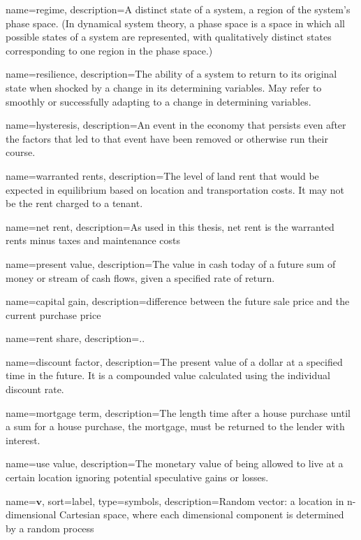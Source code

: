 {
name=regime,
description={A distinct state of a system, a region of the system's phase space. (In dynamical system theory, a phase space is a space in which all possible states of a system are represented, with qualitatively distinct  states corresponding to one region in the phase space.)}
}

{
name=resilience,
description={The ability of a system to return to its original state when shocked by a change in its determining variables. May refer to smoothly or successfully adapting to a change in  determining variables. }
}

{
name=hysteresis,
description={An event in the economy that persists even after the factors that led to that event have been removed or otherwise run their course.}
}

{
name=warranted rents,
description={The level of land rent that would be expected in equilibrium based on location and transportation costs. It may not be the rent charged to a tenant.}
}

{
name=net rent,
description={As used in this thesis, net rent is the warranted rents minus taxes and maintenance costs }
}

{
name=present value,
description={The value in cash today of a future sum of money or stream of cash flows, given a specified rate of return.}
}

{
name=capital gain,
description={difference between the future sale price and the current purchase price}
}

{
name=rent share,
description={..}
}

{
name=discount factor,
description={The present value of a dollar at a specified time in the future. It is a compounded value calculated using the individual discount rate.}
}

{
name=mortgage term,
description={The length time after a house purchase until a sum for a house purchase, the mortgage, must be returned to the lender with interest.}
}

{
name=use value,
description={The monetary value of being allowed to live at a certain location ignoring potential speculative gains or losses. }
}




{
name={$\mathbf{v}$},
sort={label},
type=symbols,
description={Random vector: a location in n-dimensional Cartesian space, where each dimensional component is determined by a random process}
}